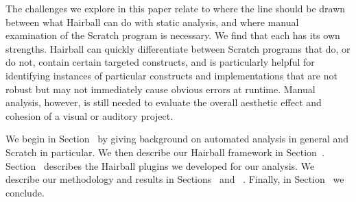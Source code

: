 The challenges we explore in this paper relate to where the line
should be drawn between what Hairball can do with static analysis, and
where manual examination of the Scratch program is necessary.  We find
that each has its own strengths.  Hairball can quickly differentiate
between Scratch programs that do, or do not, contain certain targeted
constructs, and is particularly helpful for identifying instances of
particular constructs and implementations that are not robust but may
not immediately cause obvious errors at runtime.  Manual analysis,
however, is still needed to evaluate the overall aesthetic effect and
cohesion of a visual or auditory project.

We begin in Section~ by giving background on automated
analysis in general and Scratch in particular.  We then describe our Hairball
framework in Section~.  Section~
describes the Hairball plugins we developed for our analysis.  We describe our
methodology and results in Sections~ and
~.  Finally, in Section~ we
conclude.
